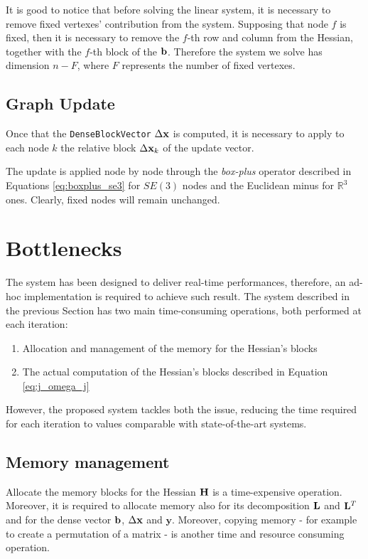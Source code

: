 It is good to notice that before solving the linear system, it is necessary to remove fixed vertexes' contribution from the system. Supposing that node $f$ is fixed, then it is necessary to remove the $f$-th row and column from the Hessian, together with the $f$-th block of the $\mathbf{b}$. Therefore the system we solve has dimension $n - F$, where $F$ represents the number of fixed vertexes.

\subsection{Graph Update}\label{subsec:update}
Once that the \texttt{DenseBlockVector} $\Delta \mathbf{x}$ is computed, it is necessary to apply to each node $k$ the relative block $\Delta \mathbf{x}_k$ of the update vector.

The update is applied node by node through the \textit{box-plus} operator described in Equations \ref{eq:boxplus_se3} for $SE(3)$ nodes and the Euclidean minus for $\mathbb{R}^3$ ones. Clearly, fixed nodes will remain unchanged. 

\section{Bottlenecks}\label{sec:bottlenecks}
The system has been designed to deliver real-time performances, therefore, an ad-hoc implementation is required to achieve such result. The system described in the previous Section has two main time-consuming operations, both performed at each iteration:

\begin{enumerate}
    \item Allocation and management of the memory for the Hessian's blocks
    \item The actual computation of the Hessian's blocks described in Equation \ref{eq:j_omega_j}
\end{enumerate}

However, the proposed system tackles both the issue, reducing the time required for each iteration to values comparable with state-of-the-art systems.

\subsection{Memory management}\label{subsec:memory_management}
Allocate the memory blocks for the Hessian $\mathbf{H}$ is a time-expensive operation. Moreover, it is required to allocate memory also for its decomposition $\mathbf{L}$ and $\mathbf{L}^T$ and for the dense vector $\mathbf{b}$, $\Delta \mathbf{x}$ and $\mathbf{y}$. Moreover, copying memory - for example to create a permutation of a matrix -  is another time and resource consuming operation. 

